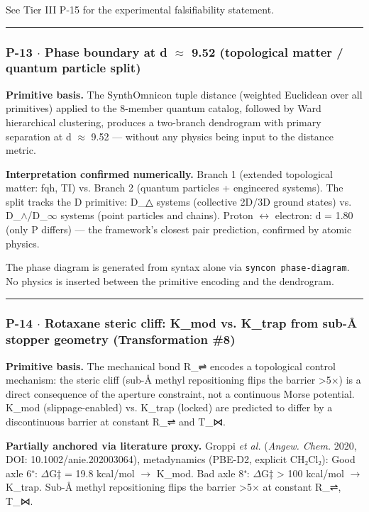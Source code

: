 \documentclass[12pt,a4paper]{article}
\begin{document}
See Tier III P-15 for the experimental falsifiability statement.

\begin{center}
\rule{0.5\textwidth}{0.4pt}
\end{center}

\subsubsection{P-13 $\cdot$ Phase boundary at d $\approx$ 9.52 (topological matter / quantum particle split)}

\textbf{Primitive basis.} The SynthOmnicon tuple distance (weighted Euclidean over all primitives) applied to the 8-member quantum catalog, followed by Ward hierarchical clustering, produces a two-branch dendrogram with primary separation at d $\approx$ 9.52 --- without any physics being input to the distance metric.

\textbf{Interpretation confirmed numerically.} Branch 1 (extended topological matter: fqh, TI) vs. Branch 2 (quantum particles + engineered systems). The split tracks the D primitive: D\_△ systems (collective 2D/3D ground states) vs. D\_$\land$/D\_$\infty$ systems (point particles and chains). Proton $\leftrightarrow$ electron: d = 1.80 (only P differs) --- the framework's closest pair prediction, confirmed by atomic physics.

The phase diagram is generated from syntax alone via \texttt{syncon phase-diagram}. No physics is inserted between the primitive encoding and the dendrogram.

\begin{center}
\rule{0.5\textwidth}{0.4pt}
\end{center}

\subsubsection{P-14 $\cdot$ Rotaxane steric cliff: K\_mod vs. K\_trap from sub-Å stopper geometry (Transformation \#8)}

\textbf{Primitive basis.} The mechanical bond R\_⇌ encodes a topological control mechanism: the steric cliff (sub-Å methyl repositioning flips the barrier \textgreater{}5$\times$) is a direct consequence of the aperture constraint, not a continuous Morse potential. K\_mod (slippage-enabled) vs. K\_trap (locked) are predicted to differ by a discontinuous barrier at constant R\_⇌ and T\_⋈.

\textbf{Partially anchored via literature proxy.} Groppi \emph{et al.} (\emph{Angew. Chem.} 2020, DOI: 10.1002/anie.202003064), metadynamics (PBE-D2, explicit CH₂Cl₂):
Good axle 6⁺: $\Delta$G‡ = 19.8 kcal/mol $\rightarrow$ K\_mod.
Bad axle 8⁺: $\Delta$G‡ \textgreater{} 100 kcal/mol $\rightarrow$ K\_trap.
Sub-Å methyl repositioning flips the barrier \textgreater{}5$\times$ at constant R\_⇌, T\_⋈.
\end{document}
